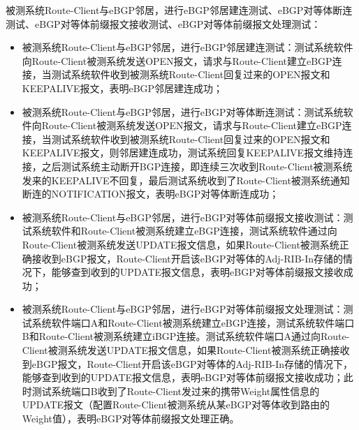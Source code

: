 被测系统Route-Client与eBGP邻居，进行eBGP邻居建连测试、eBGP对等体断连测试、eBGP对等体前缀报文接收测试、eBGP对等体前缀报文处理测试：
\begin{itemize}
  \item 被测系统Route-Client与eBGP邻居，进行eBGP邻居建连测试：测试系统软件向Route-Client被测系统发送OPEN报文，请求与Route-Client建立eBGP连接，当测试系统软件收到被测系统Route-Client回复过来的OPEN报文和KEEPALIVE报文，表明eBGP邻居建连成功；
  \item 被测系统Route-Client与eBGP邻居，进行eBGP对等体断连测试：测试系统软件向Route-Client被测系统发送OPEN报文，请求与Route-Client建立eBGP连接，当测试系统软件收到被测系统Route-Client回复过来的OPEN报文和KEEPALIVE报文，则邻居建连成功，测试系统回复KEEPALIVE报文维持连接，之后测试系统主动断开BGP连接，即连续三次收到Route-Client被测系统发来的KEEPALIVE不回复，最后测试系统收到了Route-Client被测系统通知断连的NOTIFICATION报文，表明eBGP对等体断连成功；
  \item 被测系统Route-Client与eBGP邻居，进行eBGP对等体前缀报文接收测试：测试系统软件和Route-Client被测系统建立eBGP连接，测试系统软件通过向Route-Client被测系统发送UPDATE报文信息，如果Route-Client被测系统正确接收到eBGP报文，Route-Client开启该eBGP对等体的Adj-RIB-In存储的情况下，能够查到收到的UPDATE报文信息，表明eBGP对等体前缀报文接收成功；
  \item 被测系统Route-Client与eBGP邻居，进行eBGP对等体前缀报文处理测试：测试系统软件端口A和Route-Client被测系统建立eBGP连接，测试系统软件端口B和Route-Client被测系统建立iBGP连接。测试系统软件端口A通过向Route-Client被测系统发送UPDATE报文信息，如果Route-Client被测系统正确接收到eBGP报文，Route-Client开启该eBGP对等体的Adj-RIB-In存储的情况下，能够查到收到的UPDATE报文信息，表明eBGP对等体前缀报文接收成功；此时测试系统端口B收到了Route-Client发过来的携带Weight属性信息的UPDATE报文（配置Route-Client被测系统从某eBGP对等体收到路由的Weight值），表明eBGP对等体前缀报文处理正确。
\end{itemize}


